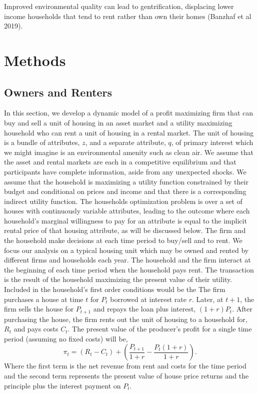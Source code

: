 \documentclass[ecta,nameyear,draft]{econsocart}
\theoremstyle{plain}
\theoremstyle{remark}
\begin{document}
Improved environmental quality can lead to gentrification, displacing lower income households that tend to rent rather than own their homes (Banzhaf et al 2019). 	 





\section{Methods}
\subsection{Owners and Renters}
In this section, we develop a dynamic model of a profit maximizing firm that can buy and sell a unit of housing in an asset market and a utility maximizing household who can rent a unit of housing in a rental market. The unit of housing is a bundle of attributes, $z$, and a separate attribute, $q$, of primary interest which we might imagine is an environmental amenity such as clean air. We assume that the asset and rental markets are each in a competitive equilibrium and that participants have complete information, aside from any unexpected shocks.
We assume that the household is maximizing a utility function constrained by their budget and conditional on prices and income and that there is a corresponding indirect utility function. The households optimization problem is over a set of houses with continuously variable attributes, leading to the outcome where each household's marginal willingness to pay for an attribute is equal to the implicit rental price of that housing attribute, as will be discussed below.
The firm and the household make decisions at each time period to buy/sell and to rent. We focus our analysis on a typical housing unit which may be owned and rented by different firms and households each year. 
The household and the firm interact at the beginning of each time period when the household pays rent. The transaction is the result of the household maximizing the present value of their utility. Included in the household's first order conditions would be the  
The firm purchases a house at time $t$ for $P_t$ borrowed at interest rate $r$. Later, at $t+1$, the firm sells the house for $P_{t+1}$ and repays the loan plus interest, $(1 + r)P_t$. After purchasing the house, the firm rents
out the unit of housing to a household for, $R_t$ and pays costs $C_t$. The present value of the producer’s profit for a single time period (assuming no fixed costs) will be,
\begin{equation}
	\pi_t = (R_t-C_t)+\left(\frac{P_{t+1}}{1+r}-\frac{P_t(1+r)}{1+r}\right).\label{pi1}
\end{equation}
Where the first term is the net revenue from rent and costs for the time period and the second term
represents the present value of house price returns and the principle plus the interest payment on $P_t$.
\end{document}
